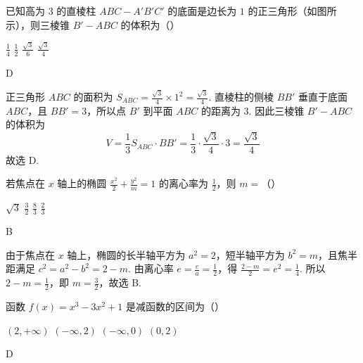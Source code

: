 \begin{problem}
已知高为 \(3\) 的直棱柱 \(ABC - A'B'C'\) 的底面是边长为 \(1\) 的正三角形（如图所示），则三棱锥 \(B' - ABC\) 的体积为（\quad）


\choices
    {\(\frac{1}{4}\)}
    {\(\frac{1}{2}\)}
    {\(\frac{\sqrt{3}}{6}\)}
    {\(\frac{\sqrt{3}}{4}\)}
\end{problem}

\begin{answer}
D
\end{answer}

\begin{solution}
正三角形 \(ABC\) 的面积为 \(S_{ABC}=\frac{\sqrt{3}}{4}\times1^2=\frac{\sqrt{3}}{4}\). 直棱柱的侧棱 \(BB'\) 垂直于底面 \(ABC\)，且 \(BB'=3\)，所以点 \(B'\) 到平面 \(ABC\) 的距离为 \(3\). 因此三棱锥 \(B'-ABC\) 的体积为
\[
V=\frac{1}{3}S_{ABC}\cdot BB'=\frac{1}{3}\cdot\frac{\sqrt{3}}{4}\cdot3=\frac{\sqrt{3}}{4}
\]
故选 D.
\end{solution}

\begin{problem}
若焦点在 \(x\) 轴上的椭圆 \(\frac{x^2}{2} + \frac{y^2}{m} = 1\) 的离心率为 \(\frac{1}{2}\)，则 \(m =\)（\quad）

\choices
    {\(\sqrt{3}\)}
    {\(\frac{3}{2}\)}
    {\(\frac{8}{3}\)}
    {\(\frac{2}{3}\)}
\end{problem}

\begin{answer}
B
\end{answer}

\begin{solution}
由于焦点在 \(x\) 轴上，椭圆的长半轴平方为 \(a^2=2\)，短半轴平方为 \(b^2=m\)，且焦半距满足 \(c^2=a^2-b^2=2-m\). 由离心率 \(e=\frac{c}{a}=\frac12\)，得 \(\frac{2-m}{2}=e^2=\frac14\). 所以 \(2-m=\frac12\)，即 \(m=\frac32\)，故选 B.
\end{solution}

\begin{problem}
函数 \( f(x) = x^3 - 3x^2 + 1 \) 是减函数的区间为（\quad）

\choices
    {\((2, +\infty)\)}
    {\((-\infty, 2)\)}
    {\((- \infty, 0)\)}
    {\((0,2)\)}
\end{problem}

\begin{answer}
D
\end{answer}

